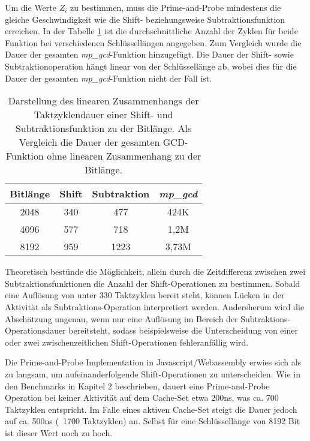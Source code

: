 Um die Werte $Z_i$ zu bestimmen, muss die Prime-and-Probe mindestens die gleiche Geschwindigkeit wie die Shift- beziehungsweise Subtraktionsfunktion erreichen.
In der Tabelle \ref{tbl:ShiftSubCycles} ist die durchschnittliche Anzahl der Zyklen für beide Funktion bei verschiedenen Schlüssellängen angegeben. Zum Vergleich wurde die Dauer der gesamten \textit{mp_gcd}-Funktion hinzugefügt.
Die Dauer der Shift- sowie Subtraktionoperation hängt linear von der Schlüssellänge ab, wobei dies für die Dauer der gesamten \textit{mp_gcd}-Funktion nicht der Fall ist.

\begin{table}[h]
\caption{Darstellung des linearen Zusammenhangs der Taktzyklendauer einer Shift- und Subtraktionsfunktion zu der Bitlänge. Als Vergleich die Dauer der gesamten GCD-Funktion ohne linearen Zusammenhang zu der Bitlänge.}
\label{tbl:ShiftSubCycles}
\begin{tabular}{cccc}
\toprule
Bitlänge & Shift & Subtraktion & \textit{mp_gcd} \\
\midrule
2048     & 340   & 477         & 424K                              \\
4096     & 577   & 718         & 1,2M                              \\
8192     & 959  & 1223        & 3,73M                             \\
\bottomrule
\end{tabular}
\end{table}

Theoretisch bestünde die Möglichkeit, allein durch die Zeitdifferenz zwischen zwei Subtraktionsfunktionen die Anzahl der Shift-Operationen zu bestimmen.
Sobald eine Auflösung von unter 330 Taktzyklen bereit steht, können Lücken in der Aktivität als Subtraktions-Operation interpretiert werden.
Andersherum wird die Abschätzung ungenau, wenn nur eine Auflösung im Bereich der Subtraktions-Operationsdauer bereitsteht, sodass beispielsweise die Unterscheidung von einer oder zwei zwischenzeitlichen Shift-Operationen fehleranfällig wird.

Die Prime-and-Probe Implementation in Javascript/Webassembly erwies sich als zu langsam, um aufeinanderfolgende Shift-Operationen zu unterscheiden.
Wie in den Benchmarks in Kapitel 2 beschrieben, dauert eine Prime-and-Probe Operation bei keiner Aktivität auf dem Cache-Set etwa 200ns, was ca. 700 Taktzyklen entspricht.
Im Falle eines aktiven Cache-Set steigt die Dauer jedoch auf ca. 500ns (~1700 Taktzyklen) an.
Selbst für eine Schlüssellänge von 8192 Bit ist dieser Wert noch zu hoch.

